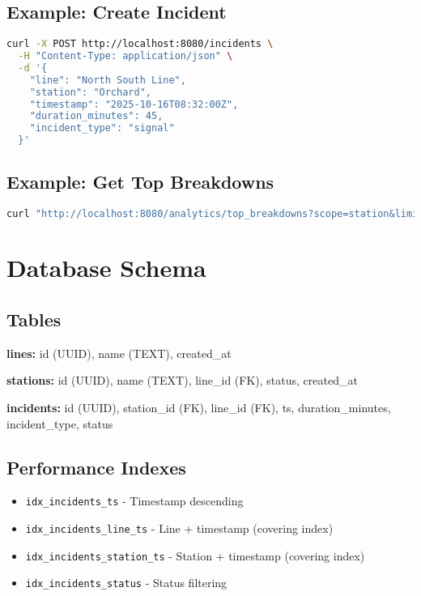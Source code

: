 \documentclass[11pt,a4paper]{article}
\begin{document}
\subsection{Example: Create Incident}

\begin{lstlisting}[language=bash]
curl -X POST http://localhost:8080/incidents \
  -H "Content-Type: application/json" \
  -d '{
    "line": "North South Line",
    "station": "Orchard",
    "timestamp": "2025-10-16T08:32:00Z",
    "duration_minutes": 45,
    "incident_type": "signal"
  }'
\end{lstlisting}

\subsection{Example: Get Top Breakdowns}

\begin{lstlisting}[language=bash]
curl "http://localhost:8080/analytics/top_breakdowns?scope=station&limit=5"
\end{lstlisting}

\section{Database Schema}

\subsection{Tables}

\textbf{lines:} id (UUID), name (TEXT), created\_at

\textbf{stations:} id (UUID), name (TEXT), line\_id (FK), status, created\_at

\textbf{incidents:} id (UUID), station\_id (FK), line\_id (FK), ts, duration\_minutes, incident\_type, status

\subsection{Performance Indexes}

\begin{itemize}[leftmargin=*]
    \item \texttt{idx\_incidents\_ts} - Timestamp descending
    \item \texttt{idx\_incidents\_line\_ts} - Line + timestamp (covering index)
    \item \texttt{idx\_incidents\_station\_ts} - Station + timestamp (covering index)
    \item \texttt{idx\_incidents\_status} - Status filtering
\end{itemize}
\end{document}
